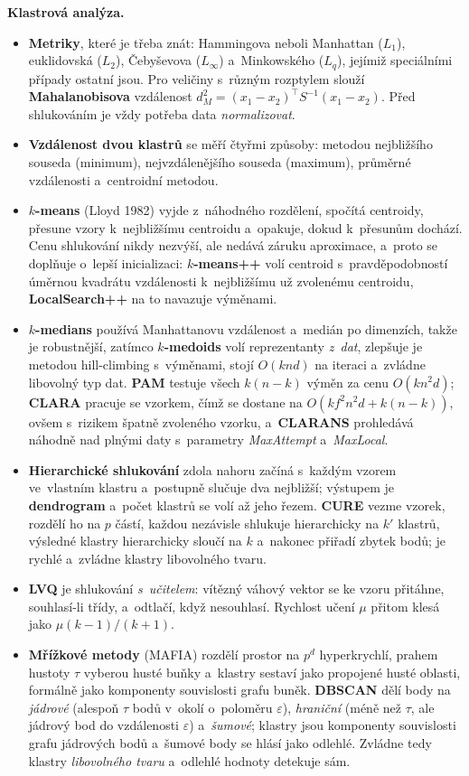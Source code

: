 \documentclass[11pt,a4paper]{article}
\theoremstyle{definition}
\begin{document}
\textbf{Klastrová analýza.}
\begin{itemize}
\item \textbf{Metriky}, které je třeba znát: Hammingova neboli Manhattan ($L_1$),
      euklidovská ($L_2$), Čebyševova ($L_\infty$) a~Minkowského ($L_q$), jejímiž
      speciálními případy ostatní jsou. Pro veličiny s~různým rozptylem slouží
      \textbf{Mahalanobisova} vzdálenost $d_M^2=(x_1-x_2)^{\!\top}S^{-1}(x_1-x_2)$. Před
      shlukováním je vždy potřeba data \emph{normalizovat}.
\item \textbf{Vzdálenost dvou klastrů} se měří čtyřmi způsoby: metodou nejbližšího souseda
      (minimum), nejvzdálenějšího souseda (maximum), průměrné vzdálenosti a~centroidní
      metodou.
\item \textbf{$k$-means} (Lloyd 1982) vyjde z~náhodného rozdělení, spočítá centroidy, přesune
      vzory k~nejbližšímu centroidu a~opakuje, dokud k~přesunům dochází. Cenu shlukování nikdy
      nezvýší, ale nedává záruku aproximace, a~proto se doplňuje o~lepší inicializaci:
      \textbf{$k$-means++} volí centroid s~pravděpodobností úměrnou kvadrátu vzdálenosti
      k~nejbližšímu už zvolenému centroidu, \textbf{LocalSearch++} na to navazuje výměnami.
\item \textbf{$k$-medians} používá Manhattanovu vzdálenost a~medián po dimenzích, takže je
      robustnější, zatímco \textbf{$k$-medoids} volí reprezentanty \emph{z~dat}, zlepšuje je
      metodou hill-climbing s~výměnami, stojí $O(knd)$ na iteraci a~zvládne libovolný typ dat.
      \textbf{PAM} testuje všech $k(n-k)$ výměn za cenu $O(kn^2d)$; \textbf{CLARA} pracuje se
      vzorkem, čímž se dostane na $O(kf^2n^2d+k(n-k))$, ovšem s~rizikem špatně zvoleného
      vzorku, a~\textbf{CLARANS} prohledává náhodně nad plnými daty s~parametry
      \emph{MaxAttempt} a~\emph{MaxLocal}.
\item \textbf{Hierarchické shlukování} zdola nahoru začíná s~každým vzorem ve~vlastním
      klastru a~postupně slučuje dva nejbližší; výstupem je \textbf{dendrogram} a~počet
      klastrů se volí až jeho řezem. \textbf{CURE} vezme vzorek, rozdělí ho na $p$ částí,
      každou nezávisle shlukuje hierarchicky na $k'$ klastrů, výsledné klastry hierarchicky
      sloučí na $k$ a~nakonec přiřadí zbytek bodů; je rychlé a~zvládne klastry libovolného
      tvaru.
\item \textbf{LVQ} je shlukování \emph{s~učitelem}: vítězný váhový vektor se ke vzoru
      přitáhne, souhlasí-li třídy, a~odtlačí, když nesouhlasí. Rychlost učení $\mu$ přitom
      klesá jako $\mu(k-1)/(k+1)$.
\item \textbf{Mřížkové metody} (MAFIA) rozdělí prostor na $p^d$ hyperkrychlí, prahem hustoty
      $\tau$ vyberou husté buňky a~klastry sestaví jako propojené husté oblasti, formálně jako
      komponenty souvislosti grafu buněk. \textbf{DBSCAN} dělí body na \emph{jádrové}
      (alespoň $\tau$ bodů v~okolí o~poloměru $\varepsilon$), \emph{hraniční} (méně než $\tau$, ale
      jádrový bod do vzdálenosti $\varepsilon$) a~\emph{šumové}; klastry jsou komponenty
      souvislosti grafu jádrových bodů a~šumové body se hlásí jako odlehlé. Zvládne tedy
      klastry \emph{libovolného tvaru} a~odlehlé hodnoty detekuje sám.
\end{itemize}
\end{document}
